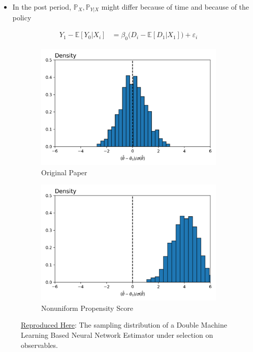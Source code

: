 \documentclass[a4paper,12pt]{article}
\begin{document}
\begin{itemize}
  \item In the post period, $\mathbb{P}_X,\mathbb{P}_{Y|X}$ might differ because of time and because of the policy
\end{itemize}
\begin{align*}
    Y_{1} - \mathbb{E}[Y_{0} | X_i] &= \beta _0 \big(D_i - \mathbb{E}[D_1 | X_1]\big) + \varepsilon_i
\end{align*}
\begin{figure}[htbp]
\centering
\begin{subfigure}{.48\textwidth}
    \centering
    \includegraphics[width=.95\linewidth]{figures/framework/dml_True.png}
    \caption{Original Paper}
\end{subfigure}
\begin{subfigure}{.48\textwidth}
    \centering
    \includegraphics[width=.95\linewidth]{figures/framework/dml_False.png}
        \caption{Nonuniform Propensity Score}
\end{subfigure}
\caption{ \href{https://github.com/pharringtonp19/rfp/blob/main/examples/scripts/dml.py}{Reproduced Here}: The sampling distribution of a Double Machine Learning Based Neural Network Estimator under selection on observables. }
\label{FIGURE LABEL}
\end{figure}
\end{document}
